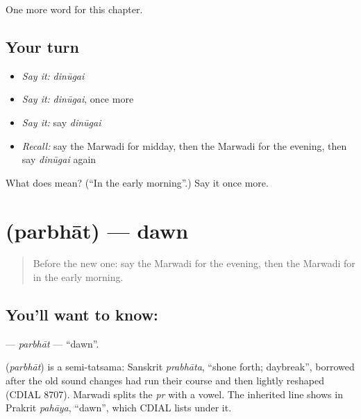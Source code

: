 \begin{grammarlens}[title={What you've built}]
One more word for this chapter.
\end{grammarlens}

\subsection*{Your turn}
\begin{itemize}
\raggedright
  \item \emph{Say it:} \emph{dinūgai}
  \item \emph{Say it:} \emph{dinūgai}, once more
  \item \emph{Say it:} say \emph{dinūgai}
  \item \emph{Recall:} say the Marwadi for midday, then the Marwadi for the evening, then say \emph{dinūgai} again
\end{itemize}

\begin{tcolorbox}[breakable,colback=teal!4,colframe=teal!35!black,title={Before you move on}]
What does  mean? (\textquotedblleft{}In the early morning\textquotedblright{}.) Say it once more.
\end{tcolorbox}
\section[\texorpdfstring{\mw{परभात} (parbhāt)}{परभात (parbhāt)}]{ (parbhāt) — dawn}

\label{lesson:MW-C90-parbhat}



\begin{quote}
Before the new one: say the Marwadi for the evening, then the Marwadi for in the early morning.
\end{quote}

\subsection*{You'll want to know: }
\textbf{} — \emph{parbhāt} — \textquotedblleft{}dawn\textquotedblright{}.

\begin{cousinweb}
\textbf{} (\emph{parbhāt}) is a semi-tatsama: Sanskrit \emph{prabhāta}, \textquotedblleft{}shone forth; daybreak\textquotedblright{}, borrowed after the old sound changes had run their course and then lightly reshaped (CDIAL 8707). Marwadi splits the \emph{pr} with a vowel. The inherited line shows in Prakrit \emph{pahāya}, \textquotedblleft{}dawn\textquotedblright{}, which CDIAL lists under it.
\end{cousinweb}

